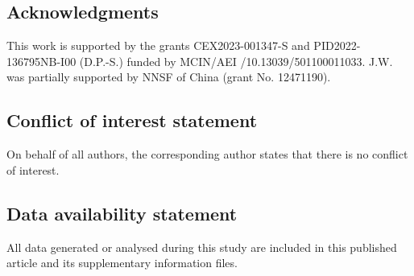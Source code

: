 \documentclass[12pt,reqno]{amsart}
\numberwithin{equation}{section}
\theoremstyle{definition}
\theoremstyle{remark}
\begin{document}

  
 

\subsection*{Acknowledgments}

\par
This work is supported by the grants CEX2023-001347-S and PID2022-136795NB-I00 (D.P.-S.) funded by MCIN/AEI /10.13039/501100011033. J.W. was partially supported by NNSF of China (grant  No.  12471190).  

\subsection*{Conflict of interest statement} On behalf of all authors, the corresponding author states that there is no conflict of interest.

\subsection*{Data availability statement} All data generated or analysed during this study are included in this published article  and its supplementary information files.

     \phantom{s}
     \thispagestyle{empty}
\end{document}
